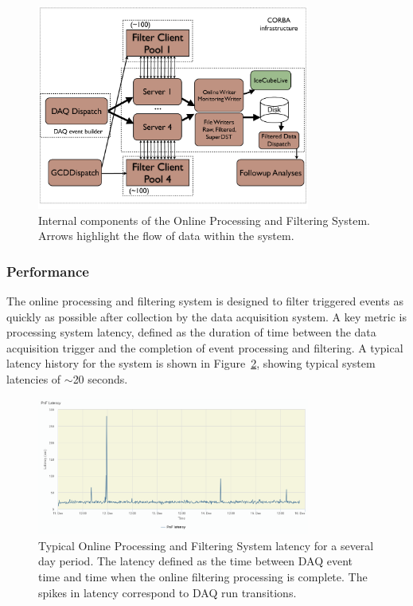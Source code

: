 \begin{figure}[!h]
 \centering
 \includegraphics[width=0.8\textwidth]{graphics/online/pnf/PnF_Internals.pdf}
 \caption{Internal components of the Online Processing and Filtering System.  Arrows highlight the flow of data within the system.}
 \label{fig:online_pnf_internals}
\end{figure}

\subsubsection{Performance}
The online processing and filtering system is designed to filter triggered events as quickly as possible after collection by
the data acquisition system.   A key metric is processing system latency, defined as the duration of time between the data acquisition trigger
and the completion of event processing and filtering.  A typical latency history for the system is shown in Figure~\ref{fig:online_pnf_latency}, showing
typical system latencies of $\sim$20 seconds.

\begin{figure}[!h]
 \centering
 \includegraphics[width=0.8\textwidth]{graphics/online/pnf/pnf_latency.png}
 \caption{Typical Online Processing and Filtering System latency for a several day period.  The latency defined as the time between DAQ event time and time when the
 online filtering processing is complete.  The spikes in latency correspond to DAQ run transitions.}
 \label{fig:online_pnf_latency}
\end{figure}

